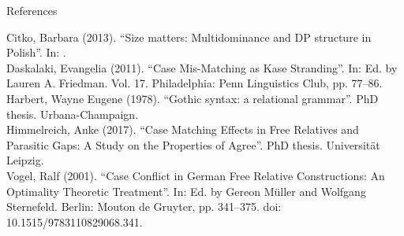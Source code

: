 \documentclass[xcolor=dvipsnames,10pt]{beamer}
\begin{document}
\begin{frame}[t]{References}

Citko, Barbara (2013). “Size matters: Multidominance and DP structure in Polish”. In: .\\
Daskalaki, Evangelia (2011). “Case Mis-Matching as Kase Stranding”. In:  Ed. by Lauren A. Friedman. Vol. 17. Philadelphia: Penn Linguistics Club, pp. 77–86.\\
Harbert, Wayne Eugene (1978). “Gothic syntax: a relational grammar”. PhD thesis. Urbana-Champaign.\\
Himmelreich, Anke (2017). “Case Matching Effects in Free Relatives and Parasitic Gaps: A Study on the Properties of Agree”. PhD thesis. Universität Leipzig.\\
Vogel, Ralf (2001). “Case Conflict in German Free Relative Constructions: An Optimality Theoretic Treatment”. In:  Ed. by Gereon Müller and Wolfgang Sternefeld. Berlin: Mouton de Gruyter, pp. 341–375. doi: 10.1515/9783110829068.341.

\end{frame}
\end{document}
